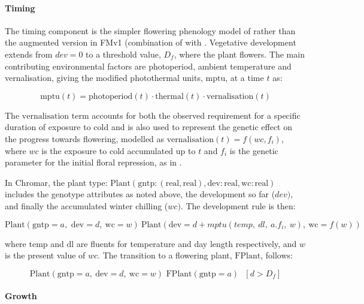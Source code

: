 \documentclass[phd]{infthesis}
\begin{document}
\paragraph{Timing}
\label{timing}

The timing component is the simpler flowering phenology model of
\citet{wilczek_effects_2009} rather than the augmented version in FMv1
(combination of \citet{chew_augmented_2012} with
\citet{salazar_prediction_2009}. Vegetative development extends from \(dev = 0\)
to a threshold value, \(D_{f}\), where the plant flowers. The main contributing
environmental factors are photoperiod, ambient temperature and vernalisation,
giving the modified photothermal units, \(\text{mptu}\), at a time \(t\) as:

\[\text{mptu}(t) = \text{photoperiod}(t) \cdot \text{thermal}(t) \cdot \text{vernalisation}(t)\]

The \(\text{vernalisation}\) term accounts for both the observed requirement for
a specific duration of exposure to cold and is also used to represent the
genetic effect on the progress towards flowering, modelled as
\(\text{vernalisation}(t) = f(wc,f_{i})\), where $wc$ is the exposure to
cold accumulated up to \(t\) and \(f_{i}\) is the genetic parameter for the
initial floral repression, as in \citet{wilczek_effects_2009}.

In Chromar, the plant type:
\(\text{Plant}(\text{gntp}:(\text{real},\text{real}),\text{dev}:\text{real},\text{wc}:\text{real})\)
includes the genotype attributes as noted above, the development so far
(\(dev)\), and finally the accumulated winter chilling (\(wc)\). The
development rule is then:

\[{\text{Plant}\left( \text{gntp} = a,\text{\ dev} = d,\ \text{wc} = w \right)\ 
}{\text{Plant}(\text{dev} = d + mptu\left( temp,\ dl,\ a.f_{i},\ w \right),\ \text{wc} = f\left( w \right))}\]

where \(\text{temp}\) and \(\text{dl}\) are fluents for temperature and day
length respectively, and $w$ is the present value of $wc$. The transition to a
flowering plant, \(\text{FPlant}\), follows:

\[\text{Plant}\left( \text{gntp} = a,\ \text{dev} = d,\ \text{wc} = w
  \right)\text{\ FPlant}\left( \text{gntp} = a \right)\text{\ \ }\left\lbrack d
    > D_{f} \right\rbrack\]

\paragraph{Growth}
\label{growth}
\end{document}
